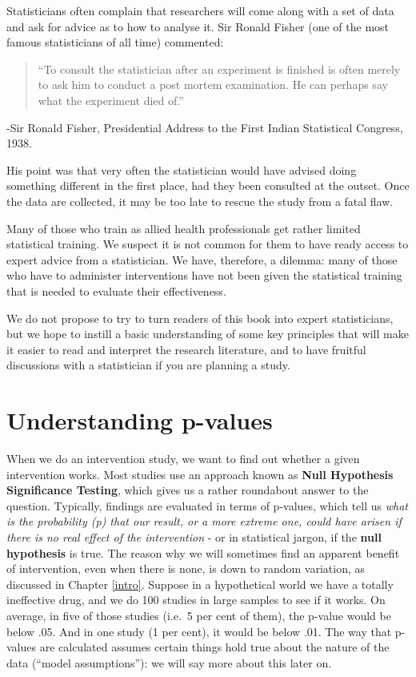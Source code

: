 \documentclass{krantz}
\begin{document}
Statisticians often complain that researchers will come along with a set of data and ask for advice as to how to analyse it. Sir Ronald Fisher (one of the most famous statisticians of all time) commented:

\begin{quote}
``To consult the statistician after an experiment is finished is often merely to ask him to conduct a post mortem examination. He can perhaps say what the experiment died of.''
\end{quote}

-Sir Ronald Fisher, Presidential Address to the First Indian Statistical Congress, 1938.

His point was that very often the statistician would have advised doing something different in the first place, had they been consulted at the outset. Once the data are collected, it may be too late to rescue the study from a fatal flaw.

Many of those who train as allied health professionals get rather limited statistical training. We suspect it is not common for them to have ready access to expert advice from a statistician. We have, therefore, a dilemma: many of those who have to administer interventions have not been given the statistical training that is needed to evaluate their effectiveness.

We do not propose to try to turn readers of this book into expert statisticians, but we hope to instill a basic understanding of some key principles that will make it easier to read and interpret the research literature, and to have fruitful discussions with a statistician if you are planning a study.

\hypertarget{understanding-p-values}{%
\section{Understanding p-values}\label{understanding-p-values}}

When we do an intervention study, we want to find out whether a given intervention works. Most studies use an approach known as \textbf{Null Hypothesis Significance Testing}, which gives us a rather roundabout answer to the question. Typically, findings are evaluated in terms of p-values, which tell us \emph{what is the probability (p) that our result, or a more extreme one, could have arisen if there is no real effect of the intervention} - or in statistical jargon, if the \textbf{null hypothesis} is true. The reason why we will sometimes find an apparent benefit of intervention, even when there is none, is down to random variation, as discussed in Chapter \ref{intro}. Suppose in a hypothetical world we have a totally ineffective drug, and we do 100 studies in large samples to see if it works. On average, in five of those studies (i.e.~5 per cent of them), the p-value would be below .05. And in one study (1 per cent), it would be below .01. The way that p-values are calculated assumes certain things hold true about the nature of the data (``model assumptions''): we will say more about this later on.
\end{document}

